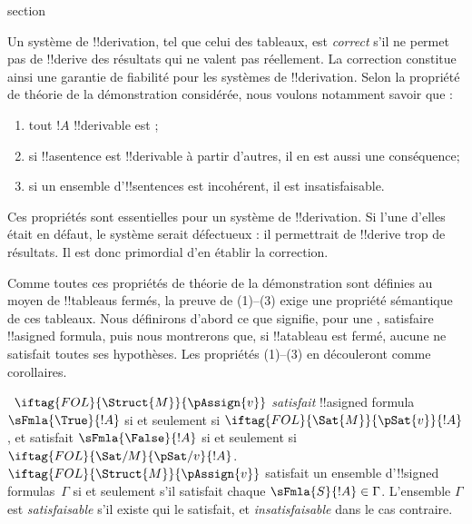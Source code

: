 \documentclass[11pt,a4paper,openany]{memoir}
\begin{document}
\endgroup




\begingroup
\expandafter\def\csname ol@sectioncs\endcsname{section}
\def\olfilename{soundness}


      {}
      {}
      

\begin{explain}
Un système de !!{derivation}, tel que celui des tableaux, est
\emph{correct} s'il ne permet pas de !!{derive} des résultats qui ne
valent pas réellement. La correction constitue ainsi une garantie de
fiabilité pour les systèmes de !!{derivation}. Selon la propriété de
théorie de la démonstration considérée, nous voulons notamment savoir
que :
\begin{enumerate}
\item tout $!A$ !!{derivable} est ;
\item si !!a{sentence} est !!{derivable} à partir d'autres, il en est
  aussi une conséquence;
\item si un ensemble d'!!{sentence}s est incohérent, il est
  insatisfaisable.
\end{enumerate}
Ces propriétés sont essentielles pour un système de !!{derivation}.
Si l'une d'elles était en défaut, le système serait défectueux : il
permettrait de !!{derive} trop de résultats. Il est donc primordial
d'en établir la correction.

Comme toutes ces propriétés de théorie de la démonstration sont
définies au moyen de !!{tableau}s fermés, la preuve de (1)--(3) exige
une propriété sémantique de ces tableaux. Nous définirons d'abord ce
que signifie, pour une , satisfaire
!!a{signed formula}, puis nous montrerons que, si !!a{tableau} est
fermé, aucune  ne satisfait toutes ses
hypothèses. Les propriétés (1)--(3) en découleront comme corollaires.
\end{explain}

\begin{defn}
~$\iftag{FOL}{\Struct{M}}{\pAssign{v}}$
\emph{satisfait} !!a{signed formula} $\sFmla{\True}{!A}$ si et seulement si
$\iftag{FOL}{\Sat{M}}{\pSat{v}}{!A}$, et satisfait
$\sFmla{\False}{!A}$ si et seulement si
$\iftag{FOL}{\Sat/{M}}{\pSat/{v}}{!A}$. $\iftag{FOL}{\Struct{M}}{\pAssign{v}}$
satisfait un ensemble d'!!{signed formula}s~$\Gamma$ si et seulement
s'il satisfait chaque $\sFmla{S}{!A} \in \Gamma$. L'ensemble
$\Gamma$ est \emph{satisfaisable} s'il existe
 qui le satisfait, et
\emph{insatisfaisable} dans le cas contraire.
\end{defn}
\end{document}
